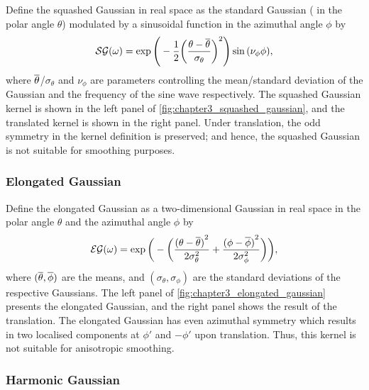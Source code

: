 Define the squashed Gaussian in real space as the standard Gaussian (\ie{} in the polar angle \(\theta{}\)) modulated by a sinusoidal function in the azimuthal angle \(\phi{}\) by
%
\begin{equation}
	\mathcal{SG}(\omega)
	= \exp\Bigg(-\frac{1}{2}{\bigg(\frac{\theta-\overline{\theta}}{\sigma_{\theta}}\bigg)}^{2}\Bigg)
	\sin{(\nu_{\phi}\phi)},
\end{equation}
%
where \(\overline{\theta}\)/\(\sigma_{\theta}\) and \(\nu_{\phi}\) are parameters controlling the mean/standard deviation of the Gaussian and the frequency of the sine wave respectively.
The squashed Gaussian kernel is shown in the left panel of \cref{fig:chapter3_squashed_gaussian}, and the translated kernel is shown in the right panel.
Under translation, the odd symmetry in the kernel definition is preserved; and hence, the squashed Gaussian is not suitable for smoothing purposes.



\subsubsection{Elongated Gaussian}

Define the elongated Gaussian as a two-dimensional Gaussian in real space in the polar angle \(\theta{}\) and the azimuthal angle \(\phi{}\) by
%
\begin{equation}
	\mathcal{EG}(\omega)
	= \exp\bigg(-\bigg(\frac{{(\theta-\overline{\theta})}^{2}}{2\sigma_{\theta}^{2}}
		+ \frac{{(\phi-\overline{\phi})}^{2}}{2\sigma_{\phi}^{2}}\bigg)\bigg),
\end{equation}
%
where \((\overline{\theta},\overline{\phi})\) are the means, and \((\sigma_{\theta},\sigma_{\phi})\) are the standard deviations of the respective Gaussians.
The left panel of \cref{fig:chapter3_elongated_gaussian} presents the elongated Gaussian, and the right panel shows the result of the translation.
The elongated Gaussian has even azimuthal symmetry which results in two localised components at \(\phi'\) and \(-\phi'\) upon translation.
Thus, this kernel is not suitable for anisotropic smoothing.



\subsubsection{Harmonic Gaussian}

